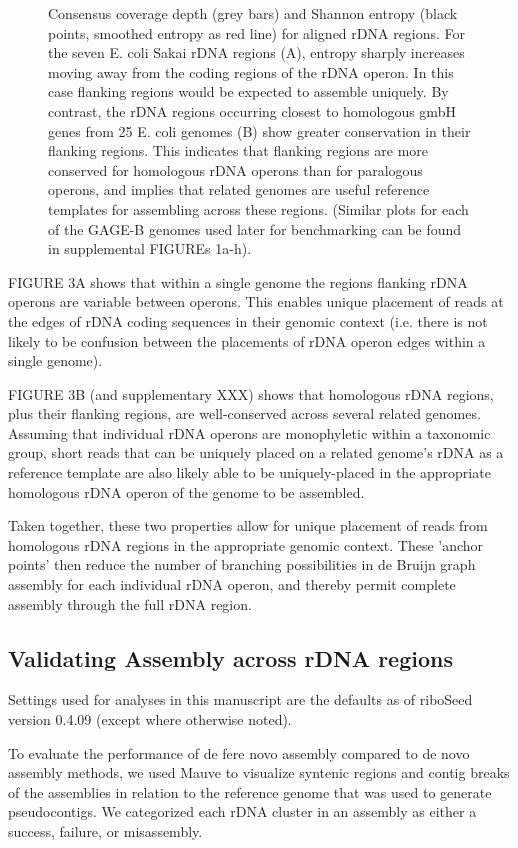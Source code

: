\documentclass[11pt]{article}
\begin{document}
\begin{linenumbers}
\begin{figure}[h]
    \caption{Consensus coverage depth (grey bars) and Shannon entropy (black points, smoothed entropy as red line) for aligned rDNA regions. For the seven E. coli Sakai rDNA regions (A), entropy sharply increases moving away from the coding regions of the rDNA operon. In this case flanking regions would be expected to assemble uniquely. By contrast, the rDNA regions occurring closest to homologous gmbH genes from 25 E. coli genomes (B) show greater conservation in their flanking regions. This indicates that flanking regions are more conserved for homologous rDNA operons than for paralogous operons, and implies that related genomes are useful reference templates for assembling across these regions. (Similar plots for each of the GAGE-B genomes used later for benchmarking can be found in supplemental FIGUREs 1a-h).}
    \label{fig:entropy}
\end{figure}

FIGURE 3A shows that within a single genome the regions flanking rDNA operons are variable between operons. This enables unique placement of reads at the edges of rDNA coding sequences in their genomic context (i.e. there is not likely to be confusion between the placements of rDNA operon edges within a single genome).


FIGURE 3B (and supplementary XXX) shows that homologous rDNA regions, plus their flanking regions, are well-conserved across several related genomes. Assuming that individual rDNA operons are monophyletic within a taxonomic group, short reads that can be uniquely placed on a related genome's rDNA as a reference template are also likely able to be uniquely-placed in the appropriate homologous rDNA operon of the genome to be assembled.


Taken together, these two properties allow for unique placement of reads from homologous rDNA regions in the appropriate genomic context. These 'anchor points' then reduce the number of branching possibilities in de Bruijn graph assembly for each individual rDNA operon, and thereby permit complete assembly through the full rDNA region.


\subsection*{Validating Assembly across rDNA regions}

Settings used for analyses in this manuscript are the defaults as of riboSeed version 0.4.09 (except where otherwise noted).


To evaluate the performance of de fere novo assembly compared to de novo assembly methods, we used Mauve to visualize syntenic regions and contig breaks of the assemblies in relation to the reference genome that was used to generate pseudocontigs. We categorized each rDNA cluster in an assembly as either a success, failure, or misassembly.



\end{linenumbers}
\end{document}
